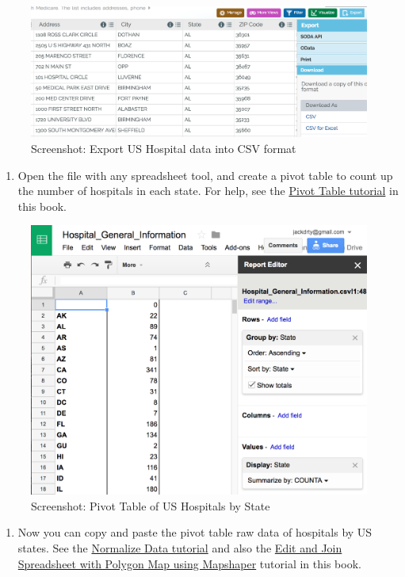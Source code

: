 \documentclass[
  english,
]{book}
\providecommand{\tightlist}{%
  \setlength{\itemsep}{0pt}\setlength{\parskip}{0pt}}
\begin{document}
\begin{figure}
\centering
\includegraphics{images/09-transform/hospital-socrata-export.png}
\caption{Screenshot: Export US Hospital data into CSV format}
\end{figure}

\begin{enumerate}
\def\labelenumi{\arabic{enumi})}
\setcounter{enumi}{1}
\tightlist
\item
  Open the file with any spreadsheet tool, and create a pivot table to count up the number of hospitals in each state. For help, see the \href{pivot}{Pivot Table tutorial} in this book.
\end{enumerate}

\begin{figure}
\centering
\includegraphics{images/09-transform/hospital-pivot-table.png}
\caption{Screenshot: Pivot Table of US Hospitals by State}
\end{figure}

\begin{enumerate}
\def\labelenumi{\arabic{enumi})}
\setcounter{enumi}{2}
\tightlist
\item
  Now you can copy and paste the pivot table raw data of hospitals by US states. See the \href{normalize}{Normalize Data tutorial} and also the \href{mapshaper}{Edit and Join Spreadsheet with Polygon Map using Mapshaper} tutorial in this book.
\end{enumerate}
\end{document}
